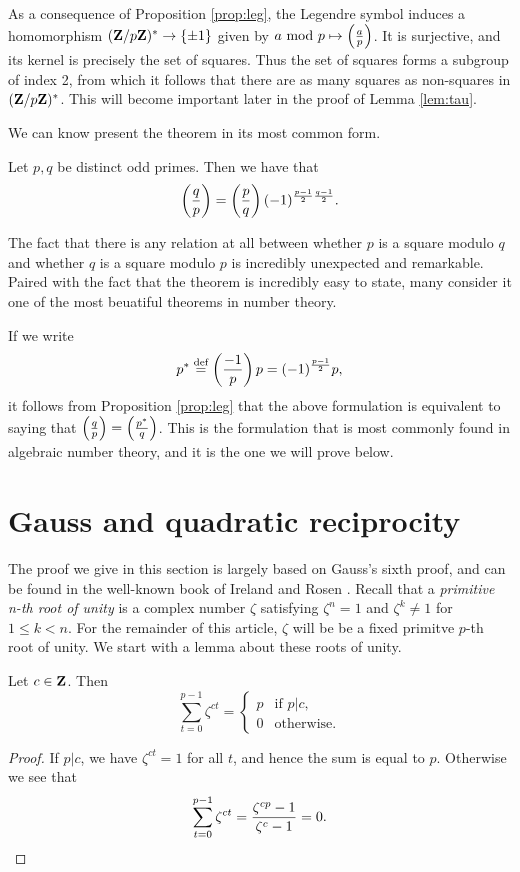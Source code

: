 \documentclass[11pt]{amsart}
\begin{document}
\begin{remark}
  \label{rem:hom}
  As a consequence of Proposition \ref{prop:leg}, the Legendre symbol induces a homomorphism $(\bf Z/p\bf Z)^* \to \{\pm 1\}$ given by $a \mod p \mapsto\leg ap$. It is surjective, and its kernel is precisely the set of squares. Thus the set of squares forms a subgroup of index 2, from which it follows that there are as many squares as non-squares in $(\bf Z/p\bf Z)^*$. This will become important later in the proof of Lemma \ref{lem:tau}.
\end{remark}

We can know present the theorem in its most common form.

\begin{theorem}
\label{thm:qr}
Let $p,q$ be distinct odd primes. Then we have that
\[\leg qp = \leg pq (-1)^{\frac{p-1}{2} \frac{q-1}{2}}. \]
\end{theorem}

The fact that there is any relation at all between whether $p$ is a square modulo $q$ and whether $q$ is a square modulo $p$ is incredibly unexpected and remarkable. Paired with the fact that the theorem is incredibly easy to state, many consider it one of the most beuatiful theorems in number theory.

If we write \[p^* \deff \leg{-1}{p} p = (-1)^{\frac{p-1}{2}} p,\] it follows from Proposition \ref{prop:leg} that the above formulation is equivalent to saying that $\leg qp = \leg{p^*}{q}$. This is the formulation that is most commonly found in algebraic number theory, and it is the one we will prove below.

\section{Gauss and quadratic reciprocity}
The proof we give in this section is largely based on Gauss's sixth proof, and can be found in the well-known book of Ireland and Rosen \cite[Chapter 6, p. 70]{ir}. Recall that a \emph{primitive n-th root of unity} is a complex number $\zeta$ satisfying $\zeta^n=1$ and $\zeta^k\neq 1$ for $1\leq k < n$. For the remainder of this article, $\zeta$ will be be a fixed primitve $p$-th root of unity. We start with a lemma about these roots of unity.

\begin{lemma}
\label{lem:pew}
Let $c\in \bf Z$. Then
\[ \sum_{t=0}^{p-1} \zeta^{ct} = \begin{cases} p &\text{if } p|c, \\ 0 &\text{otherwise.} \end{cases} \]
\end{lemma}
\begin{proof}
If $p|c$, we have $\zeta^{ct}=1$ for all $t$, and hence the sum is equal to $p$. 
Otherwise we see that
\[\sum_{t=0}^{p-1} \zeta^{ct} = \frac{\zeta^{cp}-1}{\zeta^c-1} = 0.\qedhere \]
\end{proof}
\end{document}
